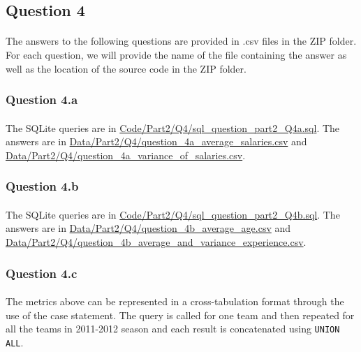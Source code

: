
\subsection{Question 4}
\label{subsec:414}

\paragraph{}The answers to the following questions are provided in .csv files in the ZIP folder. For each question, we will provide the name of the file containing the answer as well as the location of the source code in the ZIP folder.

\subsubsection{Question 4.a}
\label{subsubsec:414a}

\paragraph{}The SQLite queries are in \url{Code/Part2/Q4/sql_question_part2_Q4a.sql}. The answers are in \url{Data/Part2/Q4/question_4a_average_salaries.csv} and \url{Data/Part2/Q4/question_4a_variance_of_salaries.csv}.

\subsubsection{Question 4.b}
\label{subsubsec:414b}

\paragraph{}The SQLite queries are in \url{Code/Part2/Q4/sql_question_part2_Q4b.sql}. The answers are in \url{Data/Part2/Q4/question_4b_average_age.csv} and \url{Data/Part2/Q4/question_4b_average_and_variance_experience.csv}.

\subsubsection{Question 4.c}
\label{subsubsec:414c}

\paragraph{}The metrics above can be represented in a cross-tabulation format through the use of the case statement. The query is called for one team and then repeated for all the teams in 2011-2012 season and each result is concatenated using \verb|UNION ALL|. 

